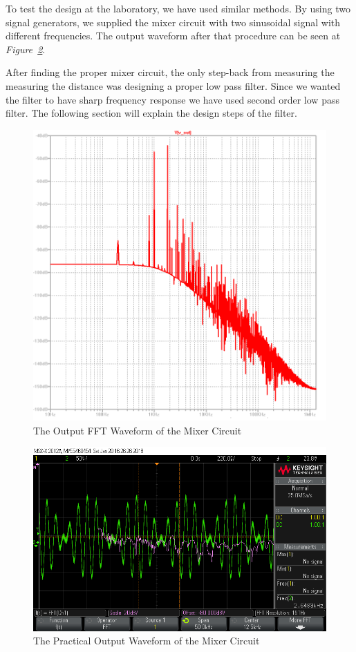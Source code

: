 \documentclass[paper]{IEEEtran}
\begin{document}
	To test the design at the laboratory, we have used similar methods. By using two signal generators, we supplied the mixer circuit with two sinusoidal signal with different frequencies. The output waveform after that procedure can be seen at \textit{Figure~\ref{fig:mixerosc1}}.
	
	After finding the proper mixer circuit, the only step-back from measuring the measuring the distance was designing a proper low pass filter. Since we wanted the filter to have sharp frequency response we have used second order low pass filter. The following section will explain the design steps of the filter.   


\begin{figure}[h!]
\setlength{\unitlength}{\textwidth}
\center 
\includegraphics[width=0.45\unitlength]{mixer_fft3.png}
\caption{\label{fig:mixerfft} The Output FFT Waveform of the Mixer Circuit }
\end{figure}	


\begin{figure}[h!]
\setlength{\unitlength}{\textwidth}
\center 
\includegraphics[width=0.45\unitlength]{mixer_osc1.png}
\caption{\label{fig:mixerosc1} The Practical Output Waveform of the Mixer Circuit }
\end{figure}	
\end{document}
